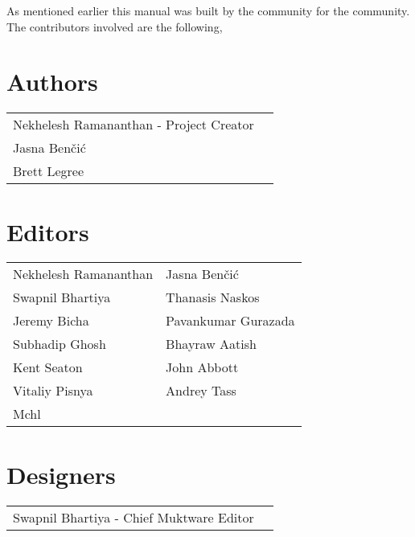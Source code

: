 As mentioned earlier this manual was built by the community for the community. The contributors involved are the following,

\section*{Authors} 
\begin{table}[ht!]
	\begin{tabular}{p{7cm} p{7cm}}
	Nekhelesh Ramananthan - Project Creator	&  \\
	Jasna Ben\v{c}i\'{c} 													&  \\
	Brett Legree 																& \\
	\end{tabular}
\end{table}

\section*{Editors}
\begin{table}[ht!]
	\begin{tabular}{p{7cm} p{7cm}}
	Nekhelesh Ramananthan 	& Jasna Ben\v{c}i\'{c} \\
	Swapnil Bhartiya 					& Thanasis Naskos \\	
	Jeremy Bicha							& Pavankumar Gurazada\\
	Subhadip Ghosh					& Bhayraw Aatish\\
	Kent Seaton							& John Abbott \\
	Vitaliy Pisnya							& Andrey Tass\\
	Mchl											&\\
	\end{tabular}
\end{table}

\section*{Designers}
\begin{table}[ht!]
	\begin{tabular}{p{7cm} p{7cm}}
	Swapnil Bhartiya - Chief Muktware Editor & \\
	\end{tabular}
\end{table}